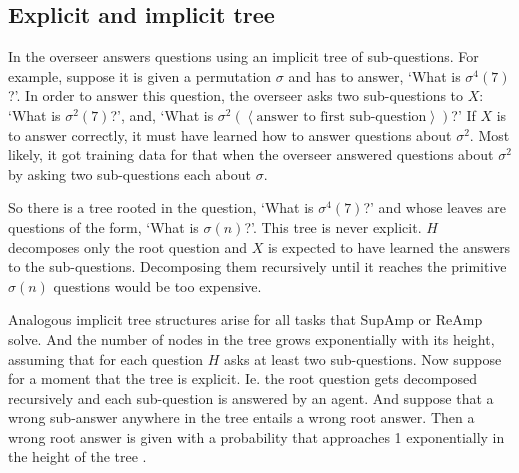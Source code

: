 \documentclass{farlamp}
\begin{document}
%
%
%
%


\subsection{Explicit and implicit tree}

In \textcite{CSASupAmp} the overseer answers questions using an implicit tree of
sub-questions. For example, suppose it is given a permutation $\sigma$ and has
to answer, ‘What is $\sigma^4(7)$?’. In order to answer this question, the
overseer asks two sub-questions to $X$: ‘What is $\sigma^2(7)$?’, and, ‘What is
$\sigma^2(\left<\text{answer to first sub-question}\right>)$?’
If $X$ is to answer correctly, it must have learned how to answer questions
about $\sigma^2$. Most likely, it got training data for that when the overseer
answered questions about $\sigma^2$ by asking two sub-questions each about
$\sigma$.

So there is a tree rooted in the question, ‘What is $\sigma^4(7)$?’ and whose
leaves are questions of the form, ‘What is $\sigma(n)$?’. This tree is never
explicit. $H$ decomposes only the root question and $X$ is expected to have
learned the answers to the sub-questions. Decomposing them recursively until it
reaches the primitive $\sigma(n)$ questions would be too expensive.

Analogous implicit tree structures arise for all tasks that SupAmp or ReAmp
solve. And the number of nodes in the tree grows exponentially with its height,
assuming that for each question $H$ asks at least two sub-questions.
Now suppose for a moment that the tree is explicit. Ie. the root question gets
decomposed recursively and each sub-question is answered by an agent. And
suppose that a wrong sub-answer anywhere in the tree entails a wrong root
answer. Then a wrong root answer is given with a probability that approaches 1
exponentially in the height of the tree \parencite{ChriRelAmp}.
\end{document}
